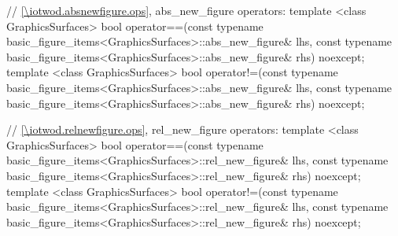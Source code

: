 \begin{codeblock}
{  // \ref{\iotwod.absnewfigure.ops}, abs_new_figure operators:
  template <class GraphicsSurfaces>
  bool operator==(const typename basic_figure_items<GraphicsSurfaces>::abs_new_figure& lhs,
    const typename basic_figure_items<GraphicsSurfaces>::abs_new_figure& rhs) noexcept;
  template <class GraphicsSurfaces>
  bool operator!=(const typename basic_figure_items<GraphicsSurfaces>::abs_new_figure& lhs,
    const typename basic_figure_items<GraphicsSurfaces>::abs_new_figure& rhs) noexcept;
  
  // \ref{\iotwod.relnewfigure.ops}, rel_new_figure operators:
  template <class GraphicsSurfaces>
  bool operator==(const typename basic_figure_items<GraphicsSurfaces>::rel_new_figure& lhs,
    const typename basic_figure_items<GraphicsSurfaces>::rel_new_figure& rhs) noexcept;
  template <class GraphicsSurfaces>
  bool operator!=(const typename basic_figure_items<GraphicsSurfaces>::rel_new_figure& lhs,
    const typename basic_figure_items<GraphicsSurfaces>::rel_new_figure& rhs) noexcept;

}
\end{codeblock}
